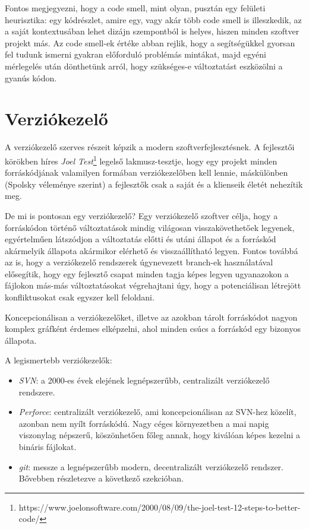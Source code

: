 Fontos megjegyezni, hogy a code smell, mint olyan, pusztán egy felületi heurisztika: egy kódrészlet, amire egy, vagy akár több code smell is illeszkedik, az a saját kontextusában lehet dizájn szempontból is helyes, hiszen minden szoftver projekt más. Az code smell-ek értéke abban rejlik, hogy a segítségükkel gyorsan fel tudunk ismerni gyakran előforduló problémás mintákat, majd egyéni mérlegelés után dönthetünk arról, hogy szükséges-e változtatást eszközölni a gyanús kódon.

\section{Verziókezelő}
\label{section:version_control}

A verziókezelő szerves részeit képzik a modern szoftverfejlesztésnek. A fejlesztői körökben híres \textit{Joel Test}\footnote{https://www.joelonsoftware.com/2000/08/09/the-joel-test-12-steps-to-better-code/} legelső lakmusz-tesztje, hogy egy projekt minden forráskódjának valamilyen formában verziókezelőben kell lennie, máskülönben (Spolsky véleménye szerint) a fejlesztők csak a saját és a klienseik életét nehezítik meg.

De mi is pontosan egy verziókezelő? Egy verziókezelő szoftver célja, hogy a forráskódon történő változtatások mindig világosan visszakövethetőek legyenek, egyértelműen látszódjon a változtatás előtti és utáni állapot és a forráskód akármelyik állapota akármikor elérhető és visszaállítható legyen. Fontos továbbá az is, hogy a verziókezelő rendszerek úgynevezett branch-ek használatával elősegítik, hogy egy fejlesztő csapat minden tagja képes legyen ugyanazokon a fájlokon más-más változtatásokat végrehajtani úgy, hogy a potenciálisan létrejött konfliktusokat csak egyszer kell feloldani.

Koncepcionálisan a verziókezelőket, illetve az azokban tárolt forráskódot nagyon komplex gráfként érdemes elképzelni, ahol minden csúcs a forráskód egy bizonyos állapota.


A legismertebb verziókezelők:
\begin{itemize}
    \item \textit{SVN}: a 2000-es évek elejének legnépszerűbb, centralizált verziókezelő rendszere.
    \item \textit{Perforce}: centralizált verziókezelő, ami koncepcionálisan az SVN-hez közelít, azonban nem nyílt forráskódú. Nagy céges környezetben a mai napig viszonylag népszerű, köszönhetően főleg annak, hogy kiválóan képes kezelni a bináris fájlokat.
    \item \textit{git}: messze a legnépszerűbb modern, decentralizált verziókezelő rendszer. Bővebben részletezve a következő szekcióban.
\end{itemize}

